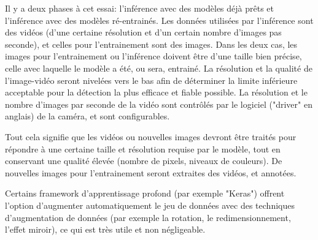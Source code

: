 \par Il y a deux phases à cet essai: l'inférence avec des modèles déjà prêts et l'inférence avec des modèles ré-entrainés. Les données utilisées par l'inférence sont des vidéos (d'une certaine résolution et d'un certain nombre d'images pas seconde), et celles pour l'entrainement sont des images. Dans les deux cas, les images pour l'entrainement ou l'inférence doivent être d'une taille bien précise, celle avec laquelle le modèle a été, ou sera, entrainé. La résolution et la qualité de l'image-vidéo seront nivelées vers le bas afin de déterminer la limite inférieure acceptable pour la détection la plus efficace et fiable possible. La résolution et le nombre d'images par seconde de la vidéo sont contrôlés par le logiciel ("driver" en anglais) de la caméra, et sont configurables. 
\par Tout cela signifie que les vidéos ou nouvelles images devront être traités pour répondre à une certaine taille et résolution requise par le modèle, tout en conservant une qualité élevée (nombre de pixels, niveaux de couleurs). De nouvelles images pour l'entrainement seront extraites des vidéos, et annotées. 
\par Certains framework d'apprentissage profond (par exemple "Keras") offrent l'option d'augmenter automatiquement le jeu de données avec des techniques d'augmentation de données (par exemple la rotation, le redimensionnement, l'effet miroir), ce qui est très utile et non négligeable.

